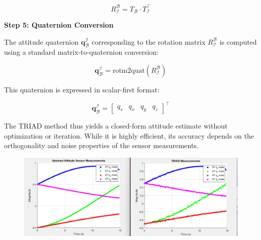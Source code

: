 \begin{equation}
    R_{\mathcal{I}}^{\mathcal{B}} = T_{\mathcal{B}} \cdot T_{\mathcal{I}}^\top
\end{equation}

\textbf{Step 5: Quaternion Conversion}

The attitude quaternion $\mathbf{q}_{\mathcal{B}}^{\mathcal{I}}$ corresponding to the rotation matrix $R_{\mathcal{I}}^{\mathcal{B}}$ is computed using a standard matrix-to-quaternion conversion:

\begin{equation}
    \mathbf{q}_{\mathcal{B}}^{\mathcal{I}} = \text{rotm2quat}(R_{\mathcal{I}}^{\mathcal{B}})
\end{equation}

This quaternion is expressed in scalar-first format:

\begin{equation}
    \mathbf{q}_{\mathcal{B}}^{\mathcal{I}} = \begin{bmatrix} q_s & q_x & q_y & q_z \end{bmatrix}^\top
\end{equation}

The TRIAD method thus yields a closed-form attitude estimate without optimization or iteration. While it is highly efficient, its accuracy depends on the orthogonality and noise properties of the sensor measurements.

\begin{figure}[H]
    \centering
    \includegraphics[width=1\textwidth]{figures/modelling/TRIAD.png}
    \caption{}
    \label{fig:CSS}
\end{figure}

\label{sec:modconclusion}